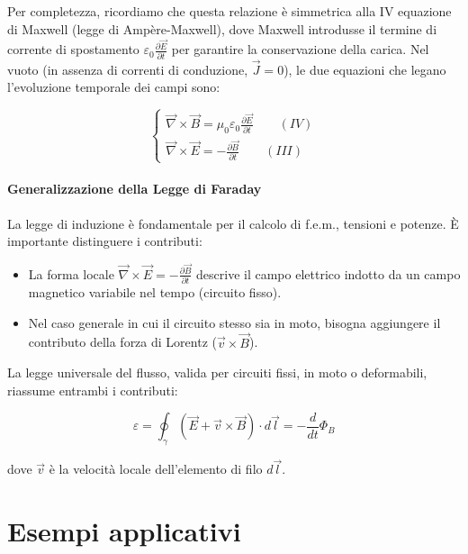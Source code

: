 \documentclass{book}
\begin{document}
Per completezza, ricordiamo che questa relazione è simmetrica alla IV equazione di Maxwell (legge di Ampère-Maxwell), dove Maxwell introdusse il termine di corrente di spostamento $\varepsilon_0\frac{\partial\vec{E}}{\partial t}$ per garantire la conservazione della carica.
Nel vuoto (in assenza di correnti di conduzione, $\vec{J}=0$), le due equazioni che legano l'evoluzione temporale dei campi sono:

$$
\begin{cases}
\vec{\nabla} \times \vec{B} = \mu_0 \varepsilon_0 \frac{\partial \vec{E}}{\partial t} \qquad (IV) \\
\vec{\nabla} \times \vec{E} = -\frac{\partial \vec{B}}{\partial t} \qquad (III)
\end{cases}
$$

\paragraph{Generalizzazione della Legge di Faraday}
La legge di induzione è fondamentale per il calcolo di f.e.m., tensioni e potenze. È importante distinguere i contributi:
\begin{itemize}
    \item La forma locale $\vec{\nabla}\times \vec{E} = -\frac{\partial \vec{B}}{\partial t}$ descrive il campo elettrico indotto da un campo magnetico variabile nel tempo (circuito fisso).
    \item Nel caso generale in cui il circuito stesso sia in moto, bisogna aggiungere il contributo della forza di Lorentz ($\vec{v}\times\vec{B}$).
\end{itemize}
La legge universale del flusso, valida per circuiti fissi, in moto o deformabili, riassume entrambi i contributi:

$$\boxed{\varepsilon = \oint_{\gamma} (\vec{E}+\vec{v}\times\vec{B})\cdot d\vec{l} = -\frac{d}{dt}\Phi_B}$$

dove $\vec{v}$ è la velocità locale dell'elemento di filo $d\vec{l}$.



\section{Esempi applicativi}
\end{document}
